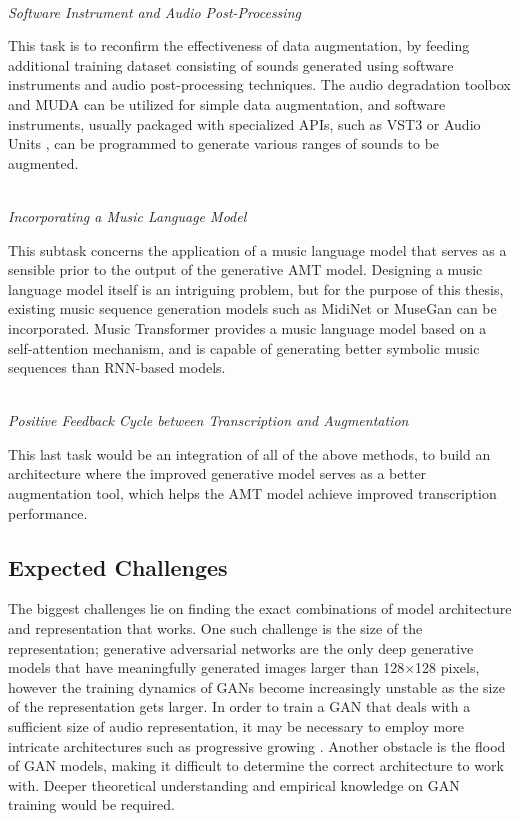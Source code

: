 \mbox{}\\\noindent\emph{Software Instrument and Audio Post-Processing}\mbox{}

This task is to reconfirm the effectiveness of data augmentation, by feeding additional training dataset consisting of sounds generated using software instruments and audio post-processing techniques.
The audio degradation toolbox \cite{mauch2013adt} and MUDA \cite{mcfee2015muda} can be utilized for simple data augmentation, and software instruments, usually packaged with specialized APIs, such as VST3 or Audio Units \cite{pirkle2014synthesizer}, can be programmed to generate various ranges of sounds to be augmented.

\mbox{}\\\noindent\emph{Incorporating a Music Language Model}\mbox{}

This subtask concerns the application of a music language model that serves as a sensible prior to the output of the generative AMT model.
Designing a music language model itself is an intriguing problem, but for the purpose of this thesis, existing music sequence generation models such as MidiNet \cite{yang2017midinet} or MuseGan \cite{dong2017musegan} can be incorporated.
Music Transformer \cite{huang2018transformer} provides a music language model based on a self-attention mechanism, and is capable of generating better symbolic music sequences than RNN-based models.

\mbox{}\\\noindent\emph{Positive Feedback Cycle between Transcription and Augmentation}\mbox{}

This last task would be an integration of all of the above methods, to build an architecture where the improved generative model serves as a better augmentation tool, which helps the AMT model achieve improved transcription performance.


\subsection{Expected Challenges}

The biggest challenges lie on finding the exact combinations of model architecture and representation that works.
One such challenge is the size of the representation; generative adversarial networks are the only deep generative models that have meaningfully generated images larger than 128$\times$128 pixels, however the training dynamics of GANs become increasingly unstable as the size of the representation gets larger.
In order to train a GAN that deals with a sufficient size of audio representation, it may be necessary to employ more intricate architectures such as progressive growing \cite{karras2017pggan}.
Another obstacle is the flood of GAN models, making it difficult to determine the correct architecture to work with.
Deeper theoretical understanding and empirical knowledge on GAN training would be required.

